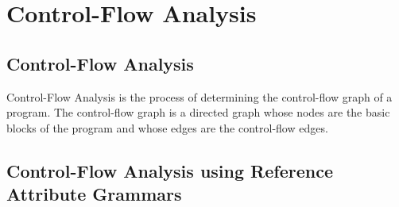 \chapter{Control-Flow Analysis}
\section{Control-Flow Analysis}
\label{sec:controlflow}
Control-Flow Analysis is the process of determining the control-flow graph of a program. 
The control-flow graph is a directed graph whose nodes are the basic blocks of the
program and whose edges are the control-flow edges.

\section{Control-Flow Analysis using Reference Attribute Grammars}